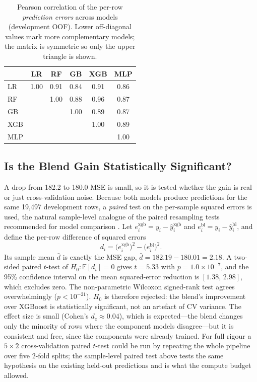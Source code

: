 \documentclass[journal]{IEEEtran}
\begin{document}
\begin{table}[!t]
\caption{Pearson correlation of the per-row \emph{prediction errors} across
models (development OOF). Lower off-diagonal values mark more complementary
models; the matrix is symmetric so only the upper triangle is shown.}
\label{tab:errcorr}
\centering
\begin{tabular}{lccccc}
\toprule
 & LR & RF & GB & XGB & MLP \\
\midrule
LR  & 1.00 & 0.91 & 0.84 & 0.91 & 0.86 \\
RF  &      & 1.00 & 0.88 & 0.96 & 0.87 \\
GB  &      &      & 1.00 & 0.89 & 0.87 \\
XGB &      &      &      & 1.00 & 0.89 \\
MLP &      &      &      &      & 1.00 \\
\bottomrule
\end{tabular}
\end{table}

\subsection{Is the Blend Gain Statistically Significant?}
\label{sec:significance}
A drop from 182.2 to 180.0 MSE is small, so it is tested whether the gain is real or just
cross-validation noise. Because both models produce predictions for the same
19{,}497 development rows, a \emph{paired} test on the per-sample squared
errors is used, the natural sample-level analogue of the paired resampling tests
recommended for model comparison \cite{dietterich1998}. Let
$e_i^{\text{xgb}}=y_i-\hat y_i^{\text{xgb}}$ and
$e_i^{\text{bl}}=y_i-\hat y_i^{\text{bl}}$, and define the per-row difference of
squared errors
\begin{equation}
d_i=\big(e_i^{\text{xgb}}\big)^{2}-\big(e_i^{\text{bl}}\big)^{2}.
\label{eq:diff}
\end{equation}
Its sample mean $\bar d$ is exactly the MSE gap, $\bar d = 182.19-180.01=2.18$.
A two-sided paired $t$-test of $H_0:\mathbb{E}[d_i]=0$ gives $t=5.33$ with
$p=1.0\times10^{-7}$, and the 95\% confidence interval on the mean squared-error
reduction is $[1.38,\,2.98]$, which excludes zero. The non-parametric Wilcoxon
signed-rank test agrees overwhelmingly ($p<10^{-21}$). $H_0$ is therefore rejected:
the blend's improvement over XGBoost is statistically significant, not an
artefact of CV variance. The effect size is small (Cohen's $d_z\approx0.04$),
which is expected---the blend changes only the minority of rows where the
component models disagree---but it is consistent and free, since the components
were already trained. For full rigour a $5\times2$ cross-validation paired
$t$-test \cite{dietterich1998} could be run by repeating the whole pipeline over
five $2$-fold splits; the sample-level paired test above tests the same
hypothesis on the existing held-out predictions and is what the compute budget
allowed.
\end{document}
